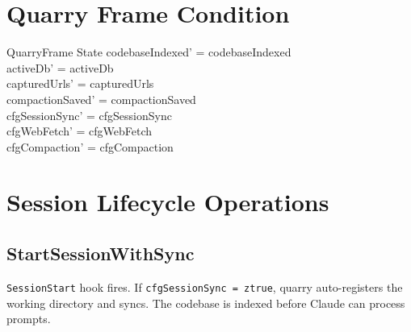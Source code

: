 \documentclass[a4paper,10pt,fleqn]{article}
\begin{document}
\section{Quarry Frame Condition}

\begin{schema}{QuarryFrame}
  \Delta State
  \where
  codebaseIndexed' = codebaseIndexed \\
  activeDb' = activeDb \\
  capturedUrls' = capturedUrls \\
  compactionSaved' = compactionSaved \\
  cfgSessionSync' = cfgSessionSync \\
  cfgWebFetch' = cfgWebFetch \\
  cfgCompaction' = cfgCompaction
\end{schema}

\section{Session Lifecycle Operations}

\subsection{StartSessionWithSync}

\texttt{SessionStart} hook fires. If \texttt{cfgSessionSync = ztrue},
quarry auto-registers the working directory and syncs. The codebase
is indexed before Claude can process prompts.
\end{document}
